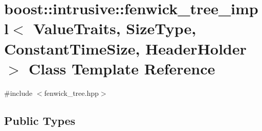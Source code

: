 \hypertarget{classboost_1_1intrusive_1_1fenwick__tree__impl}{}\section{boost\+:\+:intrusive\+:\+:fenwick\+\_\+tree\+\_\+impl$<$ Value\+Traits, Size\+Type, Constant\+Time\+Size, Header\+Holder $>$ Class Template Reference}
\label{classboost_1_1intrusive_1_1fenwick__tree__impl}


{\ttfamily \#include $<$fenwick\+\_\+tree.\+hpp$>$}

\subsection*{Public Types}
